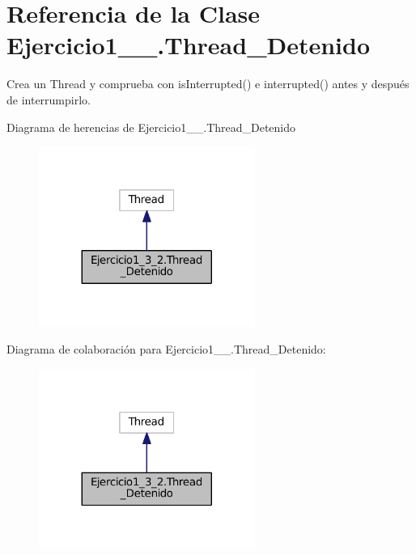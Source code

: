 \hypertarget{class_ejercicio1__3__2_1_1_thread___detenido}{}\section{Referencia de la Clase Ejercicio1\+\_\+\_.\+Thread\+\_\+\+Detenido}
\label{class_ejercicio1__3__2_1_1_thread___detenido}


Crea un Thread y comprueba con is\+Interrupted() e interrupted() antes y después de interrumpirlo.  




Diagrama de herencias de Ejercicio1\+\_\+\_.\+Thread\+\_\+\+Detenido
\nopagebreak
\begin{figure}[H]
\begin{center}
\leavevmode
\includegraphics[width=200pt]{class_ejercicio1__3__2_1_1_thread___detenido__inherit__graph}
\end{center}
\end{figure}


Diagrama de colaboración para Ejercicio1\+\_\+\_.\+Thread\+\_\+\+Detenido\+:
\nopagebreak
\begin{figure}[H]
\begin{center}
\leavevmode
\includegraphics[width=200pt]{class_ejercicio1__3__2_1_1_thread___detenido__coll__graph}
\end{center}
\end{figure}

